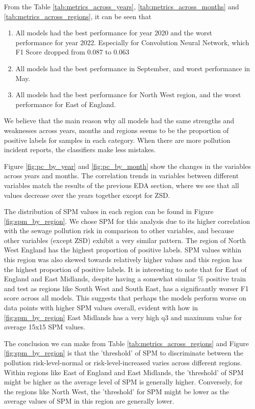 \documentclass[a4paper,11pt]{report}
\begin{document}
From the Table \ref{tab:metrics_across_years}, \ref{tab:metrics_across_months} and \ref{tab:metrics_across_regions}, it can be seen that 

\begin{enumerate}
    \item All models had the best performance for year 2020 and the worst performance for year 2022. Especially for Convolution Neural Network, which F1 Score dropped from 0.087 to 0.063
    \item All models had the best performance in September, and worst performance in May.
    \item All models had the best performance for North West region, and the worst performance for East of England.
\end{enumerate}

We believe that the main reason why all models had the same strengths and weaknesses across years, months and regions seems to be the proportion of positive labels for samples in each category. When there are more pollution incident reports, the classifiers make less mistakes. 

Figure \ref{fig:pc_by_year} and \ref{fig:pc_by_month} show the changes in the variables across years and months. The correlation trends in variables between different variables match the results of the previous EDA section, where we see that all values decrease over the years together except for ZSD. 

The distribution of SPM values in each region can be found in Figure \ref{fig:spm_by_region}. We chose SPM for this analysis due to its higher correlation with the sewage pollution risk in comparison to other variables, and because other variables (except ZSD) exhibit a very similar pattern. The region of North West England has the highest proportion of positive labels. SPM values within this region was also skewed towards relatively higher values and this region has the highest proportion of positive labels. It is interesting to note that for East of England and East Midlands, despite having a somewhat similar \% positive train and test as regions like South West and South East, has a significantly worser F1 score across all models. This suggests that perhaps the models perform worse on data points with higher SPM values overall, evident with how in \ref{fig:spm_by_region} East Midlands has a very high q3 and maximum value for average 15x15 SPM values. 

The conclusion we can make from Table \ref{tab:metrics_across_regions} and Figure \ref{fig:spm_by_region} is that the 'threshold' of SPM to discriminate between the pollution risk-level-normal or risk-level-increased varies across different regions. Within regions like East of England and East Midlands, the 'threshold' of SPM might be higher as the average level of SPM is generally higher. Conversely, for the regions like North West, the 'threshold' for SPM might be lower as the average values of SPM in this region are generally lower.
\end{document}
